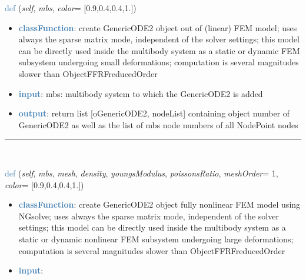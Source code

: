 \begin{itemize}[leftmargin=1.4cm]
\begin{itemize}[leftmargin=1.4cm]
\begin{itemize}[leftmargin=1.4cm]
\begin{itemize}[leftmargin=0.5cm]
\begin{itemize}[leftmargin=1.4cm]
\begin{itemize}[leftmargin=1.4cm]
\begin{itemize}[leftmargin=1.4cm]
\begin{itemize}[leftmargin=0.5cm]
\begin{flushleft}
\noindent \textcolor{steelblue}{def {\bf {}}}\label{sec:FEM:FEMinterface:CreateLinearFEMObjectGenericODE2}
({\it self}, {\it mbs}, {\it color}= [0.9,0.4,0.4,1.])
\end{flushleft}
\setlength{\itemindent}{0.7cm}
\begin{itemize}[leftmargin=0.7cm]
\item[--]\textcolor{steelblue}{\bf classFunction}: create GenericODE2 object out of (linear) FEM model; uses always the sparse matrix mode, independent of the solver settings; this model can be directly used inside the multibody system as a static or dynamic FEM subsystem undergoing small deformations; computation is several magnitudes slower than ObjectFFRFreducedOrder
\item[--]\textcolor{steelblue}{\bf input}: mbs: multibody system to which the GenericODE2 is added
\item[--]\textcolor{steelblue}{\bf output}: return list [oGenericODE2, nodeList] containing object number of GenericODE2 as well as the list of mbs node numbers of all NodePoint nodes
\vspace{12pt}\end{itemize}
%
\noindent\rule{8cm}{0.75pt}\vspace{1pt} \\ 
\begin{flushleft}
\noindent \textcolor{steelblue}{def {\bf {}}}\label{sec:FEM:FEMinterface:CreateNonlinearFEMObjectGenericODE2NGsolve}
({\it self}, {\it mbs}, {\it mesh}, {\it density}, {\it youngsModulus}, {\it poissonsRatio}, {\it meshOrder}= 1, {\it color}= [0.9,0.4,0.4,1.])
\end{flushleft}
\setlength{\itemindent}{0.7cm}
\begin{itemize}[leftmargin=0.7cm]
\item[--]\textcolor{steelblue}{\bf classFunction}: create GenericODE2 object fully nonlinear FEM model using NGsolve; uses always the sparse matrix mode, independent of the solver settings; this model can be directly used inside the multibody system as a static or dynamic nonlinear FEM subsystem undergoing large deformations; computation is several magnitudes slower than ObjectFFRFreducedOrder
\item[--]\textcolor{steelblue}{\bf input}: \vspace{-6pt}

\end{itemize}
\end{itemize}
\end{itemize}
\end{itemize}
\end{itemize}
\end{itemize}
\end{itemize}
\end{itemize}
\end{itemize}
